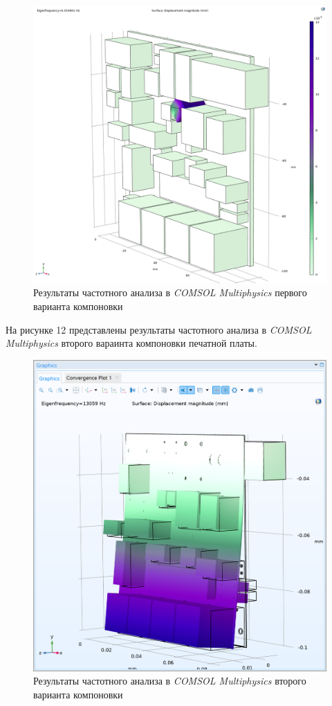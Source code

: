 \begin{figure}[H]
  \centering
  \includegraphics[scale=0.3]{../img/sst-1/freq/comsol.png}
  \caption{Результаты частотного анализа в \textit{COMSOL Multiphysics} первого варианта компоновки}
\end{figure}

На рисунке 12 представлены результаты частотного анализа в \textit{COMSOL Multiphysics} второго вараинта компоновки печатной платы.

\begin{figure}[H]
  \centering
  \includegraphics[scale=0.3]{../img/scrot/Screenshot-2024-05-16-014808.png}
  \caption{Результаты частотного анализа в \textit{COMSOL Multiphysics}
    второго варианта компоновки}
\end{figure}

